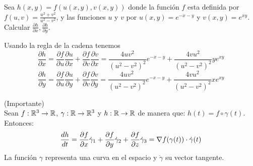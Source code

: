 \begin{ejemplo} 
Sea $h(x,y)=f(u(x,y),v(x,y))$ donde la funci\'on $f$ esta definida por $f(u,v)=\frac{u^2+v^2}{u^2-v^2}$,  y las funciones $u$ y $v$  por
$u(x,y)=e^{-x-y}$ y $v(x,y)=e^{xy}$.
Calcular $\frac{\partial h}{\partial x},\frac{\partial h}{\partial y}.$ 

\begin{solucion}
Usando la regla de la cadena tenemos
$$\frac{\partial h}{\partial x}=\frac{\partial f}{\partial u}
\frac{\partial u}{\partial x}+\frac{\partial f}{\partial v}\frac{\partial v}
{\partial x}=\frac{4uv^2}{(u^2-v^2)^2}e^{-x-y}+\frac{4vu^2}{(u^2-v^2)^2}ye^{xy}$$ 
$$\frac{\partial h}{\partial y}=\frac{\partial f}{\partial u}
\frac{\partial u}{\partial y}+\frac{\partial f}{\partial v}
\frac{\partial v}{\partial y}=
\frac{4uv^2}{(u^2-v^2)^2}e^{-x-y}+\frac{4vu^2}{(u^2-v^2)^2}xe^{xy}$$
\end{solucion}
\end{ejemplo}

\begin{ejemplo}{\rm (Importante)} 
\\Sean $f:\mathbb{R}^3\to\mathbb{R}$,  $\gamma:\mathbb{R}\to\mathbb{R}^3$ y $h:\mathbb{R}\to\mathbb{R}$ de manera que: $h(t)=f\circ\gamma(t)$. Entonces:
$$
\frac{dh}{dt}=\frac{\partial f}{\partial x}{\dot {\gamma}}_1+\frac{\partial f}{\partial y}{\dot {\gamma}}_2+
\frac{\partial f}{\partial z}{\dot{\gamma}}_3=\nabla f(\gamma(t))\cdot{\dot {\gamma}}(t)$$
La funci\'on $\gamma$ representa una curva en el espacio y {$\dot \gamma$} su vector tangente.
\end{ejemplo}

